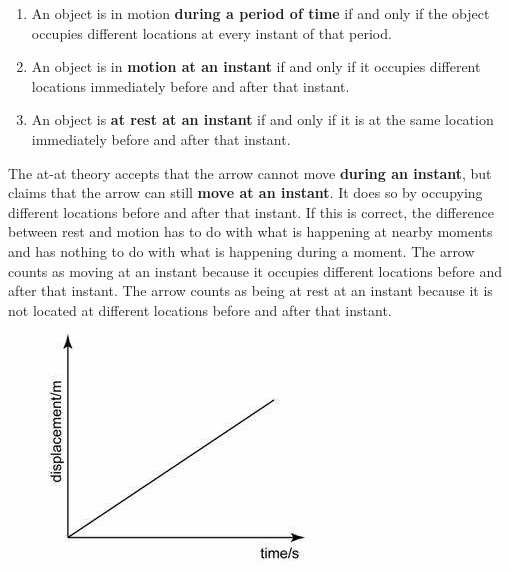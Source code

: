 \documentclass[oneside]{article}
\begin{document}
\begin{enumerate}
\item An object is in motion \textbf{during a period of time} if and only if the object occupies different locations at every instant of that period.
\item An object is in \textbf{motion at an instant} if and only if it occupies different locations immediately before and after that instant. 
\item An object is \textbf{at rest at an instant} if and only if it is at the same location immediately before and after that instant. 
\end{enumerate}
The at-at theory accepts that the arrow cannot move \textbf{during an instant}, but claims that the arrow can still \textbf{move at an instant}. It does so by occupying different locations before and after that instant. If this is correct, the difference between rest and motion has to do with what is happening at nearby moments and has nothing to do with what is happening during a moment. The arrow counts as moving at an instant because it occupies different locations before and after that instant. The arrow counts as being at rest at an instant because it is not located at different locations before and after that instant.
\newpage

\begin{figure}[h]
  \includegraphics[width=\linewidth]{graph.jpg}
\end{figure}
\end{document}
